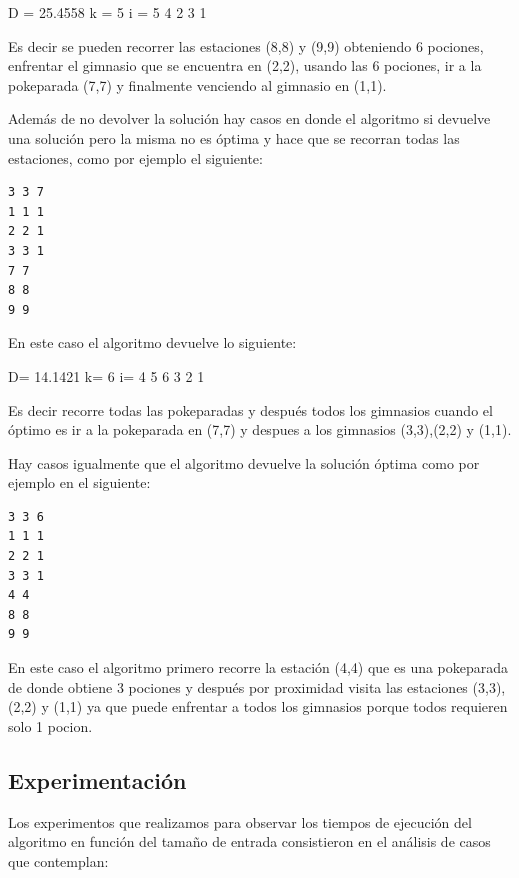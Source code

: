       D = 25.4558 k = 5 i = 5 4 2 3 1

      Es decir se pueden recorrer las estaciones (8,8) y (9,9) obteniendo 6 pociones, enfrentar el gimnasio que se encuentra en (2,2), usando las 6 pociones, ir a la pokeparada (7,7) y finalmente venciendo al gimnasio en (1,1).

      Además de no devolver la solución hay casos en donde el algoritmo si devuelve una solución pero la misma no es óptima y hace que se recorran todas las estaciones, como por ejemplo el siguiente:

\begin{codesnippet}
            \begin{verbatim}
3 3 7
1 1 1
2 2 1
3 3 1
7 7
8 8
9 9

\end{verbatim}
            \end{codesnippet}


      En este caso el algoritmo devuelve lo siguiente:

      D= 14.1421 k= 6 i= 4 5 6 3 2 1

      Es decir recorre todas las pokeparadas y después todos los gimnasios cuando el óptimo es ir a la pokeparada en (7,7) y despues a los gimnasios (3,3),(2,2) y (1,1). 

      Hay casos igualmente que el algoritmo devuelve la solución óptima como por ejemplo en el siguiente:

      \begin{codesnippet}
            \begin{verbatim}
3 3 6
1 1 1
2 2 1
3 3 1
4 4
8 8
9 9

\end{verbatim}
            \end{codesnippet}


      En este caso el algoritmo primero recorre la estación (4,4) que es una pokeparada de donde obtiene 3 pociones y después por proximidad visita las estaciones (3,3),(2,2) y (1,1) ya que puede enfrentar a todos los gimnasios porque todos requieren solo 1 pocion. 

\subsection{Experimentación}

      Los experimentos que realizamos para observar los tiempos de ejecución del algoritmo en función del tamaño de entrada consistieron en el análisis de casos que contemplan:

